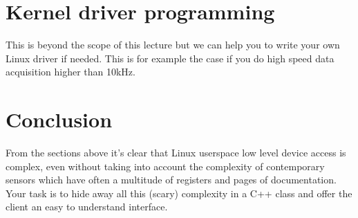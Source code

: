 \documentclass[12pt]{report}
\begin{document}
\section{Kernel driver programming}

This is beyond the scope of this lecture but we can help you to write
your own Linux driver if needed. This is for example the case if you
do high speed data acquisition higher than 10kHz.

\section{Conclusion}

From the sections above it's clear that Linux userspace low level
device access is complex, even without taking into account the
complexity of contemporary sensors which have often a multitude of
registers and pages of documentation. Your task is to hide away
all this (scary) complexity in a C++ class and offer the client
an easy to understand interface.
\end{document}
